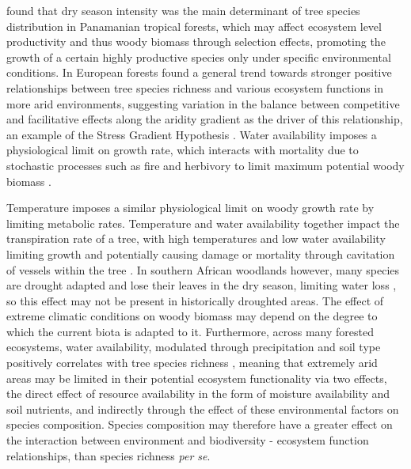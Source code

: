 \documentclass[11pt,a4paper]{article}
\begin{document}
\citet{Condit2013} found that dry season intensity was the main determinant of tree species distribution in Panamanian tropical forests, which may affect ecosystem level productivity and thus woody biomass through selection effects, promoting the growth of a certain highly productive species only under specific environmental conditions. In European forests \citep{Ratcliffe2017} found a general trend towards stronger positive relationships between tree species richness and various ecosystem functions in more arid environments, suggesting variation in the balance between competitive and facilitative effects along the aridity gradient as the driver of this relationship, an example of the Stress Gradient Hypothesis \citep{Dohn2013}. Water availability imposes a physiological limit on growth rate, which interacts with mortality due to stochastic processes such as fire and herbivory to limit maximum potential woody biomass \citep{}. 

Temperature imposes a similar physiological limit on woody growth rate by limiting metabolic rates. Temperature and water availability together impact the transpiration rate of a tree, with high temperatures and low water availability limiting growth and potentially causing damage or mortality through cavitation of vessels within the tree \citep{Rowland2015a, Fensham2009}. In southern African woodlands however, many species are drought adapted and lose their leaves in the dry season, limiting water loss \citep{Solbrig1996}, so this effect may not be present in historically droughted areas. The effect of extreme climatic conditions on woody biomass may depend on the degree to which the current biota is adapted to it. Furthermore, across many forested ecosystems, water availability, modulated through precipitation and soil type positively correlates with tree species richness \citep{Vila2005}, meaning that extremely arid areas may be limited in their potential ecosystem functionality via two effects, the direct effect of resource availability in the form of moisture availability and soil nutrients, and indirectly through the effect of these environmental factors on species composition. Species composition may therefore have a greater effect on the interaction between environment and biodiversity - ecosystem function relationships, than species richness \textit{per se}.

\end{document}
